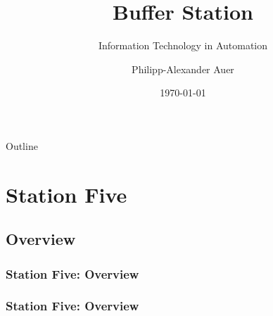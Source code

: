 \documentclass{beamer}
\title[Buffering Station]{%
  Buffer Station
}
\subtitle{Information Technology in Automation}
\author{Philipp-Alexander Auer}
\date{\today}
\begin{document}
\begin{frame}
  \titlepage
\end{frame}

\begin{frame}{Outline}
  \tableofcontents
\end{frame}

\section{Station Five}

\subsection[Overview]{Overview}
\begin{frame}[fragile]
\frametitle{Station Five: Overview}
\begin{figure}
	\centering
	\label{fig:stat54}
\end{figure}
\end{frame}

\begin{frame}[fragile]
\frametitle{Station Five: Overview}
\begin{figure}
	\centering
	\label{fig:stat55}
\end{figure}
\end{frame}
\end{document}
